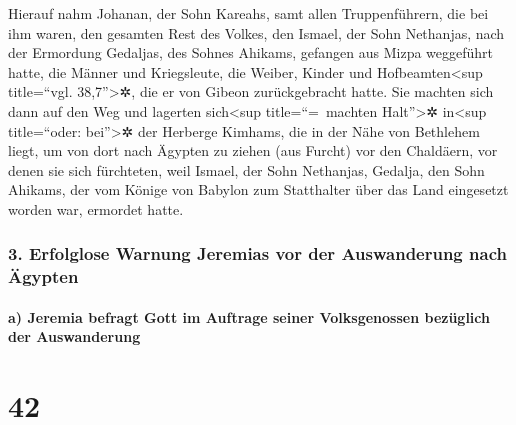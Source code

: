 Hierauf nahm Johanan, der Sohn Kareahs, samt allen
Truppenführern, die bei ihm waren, den gesamten Rest des Volkes, den
Ismael, der Sohn Nethanjas, nach der Ermordung Gedaljas, des Sohnes
Ahikams, gefangen aus Mizpa weggeführt hatte, die Männer und
Kriegsleute, die Weiber, Kinder und Hofbeamten\textless sup title=``vgl.
38,7''\textgreater✲, die er von Gibeon zurückgebracht hatte.
Sie machten sich dann auf den Weg und lagerten
sich\textless sup title=``=~machten Halt''\textgreater✲ in\textless sup
title=``oder: bei''\textgreater✲ der Herberge Kimhams, die in der Nähe
von Bethlehem liegt, um von dort nach Ägypten zu ziehen
(aus Furcht) vor den Chaldäern, vor denen sie sich
fürchteten, weil Ismael, der Sohn Nethanjas, Gedalja, den Sohn Ahikams,
der vom Könige von Babylon zum Statthalter über das Land eingesetzt
worden war, ermordet hatte.

\hypertarget{erfolglose-warnung-jeremias-vor-der-auswanderung-nach-uxe4gypten}{%
\subsubsection{3. Erfolglose Warnung Jeremias vor der Auswanderung nach
Ägypten}\label{erfolglose-warnung-jeremias-vor-der-auswanderung-nach-uxe4gypten}}

\hypertarget{a-jeremia-befragt-gott-im-auftrage-seiner-volksgenossen-bezuxfcglich-der-auswanderung}{%
\paragraph{a) Jeremia befragt Gott im Auftrage seiner Volksgenossen
bezüglich der
Auswanderung}\label{a-jeremia-befragt-gott-im-auftrage-seiner-volksgenossen-bezuxfcglich-der-auswanderung}}

\hypertarget{section-41}{%
\section{42}\label{section-41}}

